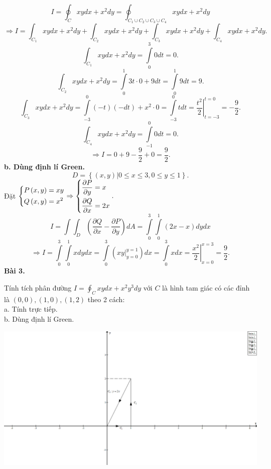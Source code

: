 \documentclass[12pt,a4paper]{article}
\begin{document}
\[I = \oint_C {xydx + {x^2}dy = \oint_{{C_1} \cup {C_2} \cup {C_3} \cup {C_4}} {xydx + {x^2}dy} } \]
\[ \Rightarrow I = \int_{{C_1}} {xydx + {x^2}dy}  + \int_{{C_2}} {xydx + {x^2}dy}  + \int_{{C_3}} {xydx + {x^2}dy}  + \int_{{C_4}} {xydx + {x^2}dy}. \]
\[\int_{{C_1}} {xydx + {x^2}dy}  = \int\limits_0^3 0 dt = 0.\]
\[\int_{{C_2}} {xydx + {x^2}dy}  = \int\limits_0^1 {3t \cdot 0 + 9dt}  = \int\limits_0^1 {9dt}  = 9.\]
\[\int_{{C_3}} {xydx + {x^2}dy}  = \int\limits_{ - 3}^0 {\left( { - t} \right)\left( { - dt} \right) + {x^2} \cdot 0}  = \int\limits_{ - 3}^0 {tdt = \left. {\frac{{{t^2}}}{2}} \right|} _{t =  - 3}^{t = 0} =  - \frac{9}{2}.\]
\[\int_{{C_4}} {xydx + {x^2}dy}  = \int\limits_{ - 1}^0 {0dt}  = 0.\]
\[ \Rightarrow I = 0 + 9 - \frac{9}{2} + 0 = \frac{9}{2}.\]
\textbf{b. Dùng định lí Green.}
\[D = \left\{ {\left. {\left( {x,y} \right)} \right|0 \leqslant x \leqslant 3,0 \leqslant y \leqslant 1} \right\}.\]
Đặt \(\left\{ \begin{gathered}
  P\left( {x,y} \right) = xy \hfill \\
  Q\left( {x,y} \right) = {x^2} \hfill \\ 
\end{gathered}  \right. \Rightarrow \left\{ \begin{gathered}
  \frac{{\partial P}}{{\partial y}} = x \hfill \\
  \frac{{\partial Q}}{{\partial x}} = 2x \hfill \\ 
\end{gathered}  \right..\)
\[I = \int {\int_D {\left( {\frac{{\partial Q}}{{\partial x}} - \frac{{\partial P}}{{\partial y}}} \right)} } dA = \int\limits_0^3 {\int\limits_0^1 {\left( {2x - x} \right)dydx} } \]
\[ \Rightarrow I = \int\limits_0^3 {\int\limits_0^1 {xdydx} }  = \int\limits_0^3 {\left( {\left. {xy} \right|_{y = 0}^{y = 1}} \right)} dx = \int\limits_0^3 {xdx}  = \left. {\frac{{{x^2}}}{2}} \right|_{x = 0}^{x = 3} = \frac{9}{2}.\]
\textbf{Bài 3.}
\begin{mybox}
Tính tích phân đường \(I = \oint_C {xydx + {x^2}{y^3}dy} \) với \(C\) là hình tam giác có các đỉnh là \(\left( {0,0} \right),\left( {1,0} \right),\left( {1,2} \right)\) theo 2 cách:\\
a. Tính trực tiếp.\\
b. Dùng định lí Green.
\end{mybox}
\begin{center}
	\includegraphics[scale=0.3]{c4_8}
\end{center}
\end{document}
